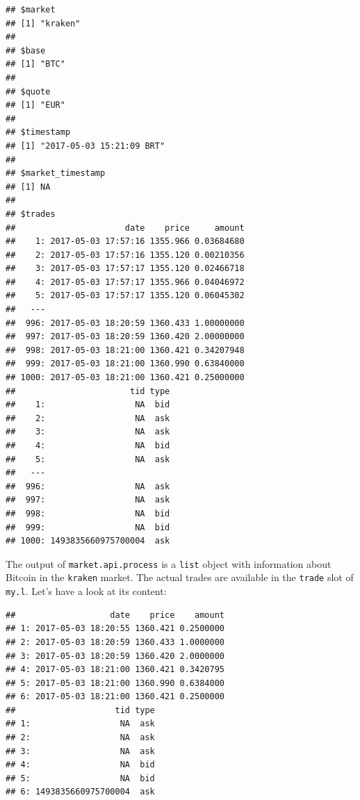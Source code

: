 \documentclass[11pt,]{book}
\newenvironment{Shaded}{\begin{snugshade}}{\end{snugshade}}
\newcommand{\KeywordTok}[1]{\textcolor[rgb]{0.27,0.27,0.27}{\textbf{#1}}}
\newcommand{\OperatorTok}[1]{\textcolor[rgb]{0.81,0.36,0.00}{\textbf{#1}}}
\newcommand{\NormalTok}[1]{#1}
\begin{document}
\begin{verbatim}
## $market
## [1] "kraken"
## 
## $base
## [1] "BTC"
## 
## $quote
## [1] "EUR"
## 
## $timestamp
## [1] "2017-05-03 15:21:09 BRT"
## 
## $market_timestamp
## [1] NA
## 
## $trades
##                      date    price     amount
##    1: 2017-05-03 17:57:16 1355.966 0.03684680
##    2: 2017-05-03 17:57:16 1355.120 0.00210356
##    3: 2017-05-03 17:57:17 1355.120 0.02466718
##    4: 2017-05-03 17:57:17 1355.966 0.04046972
##    5: 2017-05-03 17:57:17 1355.120 0.06045302
##   ---                                        
##  996: 2017-05-03 18:20:59 1360.433 1.00000000
##  997: 2017-05-03 18:20:59 1360.420 2.00000000
##  998: 2017-05-03 18:21:00 1360.421 0.34207948
##  999: 2017-05-03 18:21:00 1360.990 0.63840000
## 1000: 2017-05-03 18:21:00 1360.421 0.25000000
##                       tid type
##    1:                  NA  bid
##    2:                  NA  ask
##    3:                  NA  ask
##    4:                  NA  bid
##    5:                  NA  ask
##   ---                         
##  996:                  NA  ask
##  997:                  NA  ask
##  998:                  NA  bid
##  999:                  NA  bid
## 1000: 1493835660975700004  ask
\end{verbatim}

The output of \texttt{market.api.process} is a \texttt{list} object with
information about Bitcoin in the
\texttt{\textquotesingle{}kraken\textquotesingle{}} market. The actual
trades are available in the \texttt{trade} slot of \texttt{my.l}. Let's
have a look at its content:

\begin{Shaded}
\end{Shaded}

\begin{verbatim}
##                   date    price    amount
## 1: 2017-05-03 18:20:55 1360.421 0.2500000
## 2: 2017-05-03 18:20:59 1360.433 1.0000000
## 3: 2017-05-03 18:20:59 1360.420 2.0000000
## 4: 2017-05-03 18:21:00 1360.421 0.3420795
## 5: 2017-05-03 18:21:00 1360.990 0.6384000
## 6: 2017-05-03 18:21:00 1360.421 0.2500000
##                    tid type
## 1:                  NA  ask
## 2:                  NA  ask
## 3:                  NA  ask
## 4:                  NA  bid
## 5:                  NA  bid
## 6: 1493835660975700004  ask
\end{verbatim}
\end{document}
